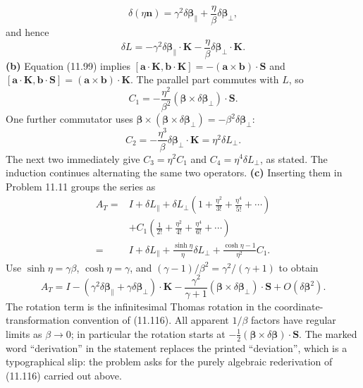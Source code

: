 \[
\delta(\eta\mathbf n)
=\gamma^2\delta\boldsymbol\beta_\parallel
+\frac\eta\beta\delta\boldsymbol\beta_\perp,
\]
and hence
\[
\boxed{\delta L=-\gamma^2\delta\boldsymbol\beta_\parallel\cdot\mathbf K
-\frac\eta\beta\delta\boldsymbol\beta_\perp\cdot\mathbf K.}
\]
\textbf{(b)} Equation (11.99) implies
$[\mathbf a\cdot\mathbf K,\mathbf b\cdot\mathbf K]
=-(\mathbf a\times\mathbf b)\cdot\mathbf S$ and
$[\mathbf a\cdot\mathbf K,\mathbf b\cdot\mathbf S]
=(\mathbf a\times\mathbf b)\cdot\mathbf K$.
The parallel part commutes with $L$, so
\[
C_1=-\frac{\eta^2}{\beta^2}
 (\boldsymbol\beta\times\delta\boldsymbol\beta_\perp)\cdot\mathbf S.
\]
One further commutator uses
$\boldsymbol\beta\times(\boldsymbol\beta\times
\delta\boldsymbol\beta_\perp)=-\beta^2\delta\boldsymbol\beta_\perp$:
\[
C_2=-\frac{\eta^3}{\beta}\delta\boldsymbol\beta_\perp\cdot\mathbf K
=\eta^2\delta L_\perp.
\]
The next two immediately give $C_3=\eta^2C_1$ and
$C_4=\eta^4\delta L_\perp$, as stated. The induction continues
alternating the same two operators.
\textbf{(c)} Inserting them in Problem 11.11 groups the series as
\begin{align*}
A_T={}&I+\delta L_\parallel
+\delta L_\perp\left(1+\frac{\eta^2}{3!}+\frac{\eta^4}{5!}+\cdots\right)\\
&+C_1\left(\frac1{2!}+\frac{\eta^2}{4!}+\frac{\eta^4}{6!}+\cdots\right)\\
={}&I+\delta L_\parallel
+\frac{\sinh\eta}{\eta}\delta L_\perp
+\frac{\cosh\eta-1}{\eta^2}C_1.
\end{align*}
Use $\sinh\eta=\gamma\beta$, $\cosh\eta=\gamma$, and
$(\gamma-1)/\beta^2=\gamma^2/(\gamma+1)$ to obtain
\[
\boxed{A_T=I-(\gamma^2\delta\boldsymbol\beta_\parallel
+\gamma\delta\boldsymbol\beta_\perp)\cdot\mathbf K
-\frac{\gamma^2}{\gamma+1}
(\boldsymbol\beta\times\delta\boldsymbol\beta_\perp)\cdot\mathbf S
+O(\delta\boldsymbol\beta^2).}
\]
The rotation term is the infinitesimal Thomas rotation in the
coordinate-transformation convention of (11.116). All apparent
$1/\beta$ factors have regular limits as $\beta\to0$; in particular
the rotation starts at $-\tfrac12(\boldsymbol\beta\times
\delta\boldsymbol\beta)\cdot\mathbf S$.
The marked word ``derivation'' in the statement replaces the printed
``deviation'', which is a typographical slip: the problem asks for the
purely algebraic rederivation of (11.116) carried out above.

